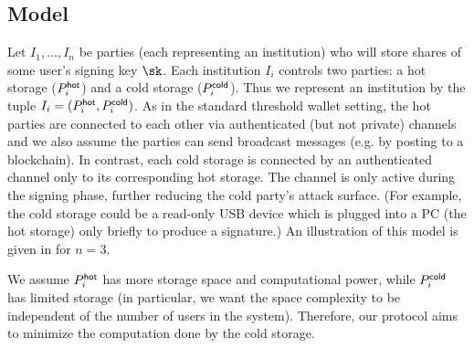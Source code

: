 \subsection{Model}\label{sec:model}



Let $I_1, \ldots, I_n$ be parties (each representing an institution) who will store shares of some user's signing key $\sk$. Each institution $I_i$ controls two parties: a hot storage ($P_i^{\mathsf{hot}}$) and a cold storage ($P_i^{\mathsf{cold}}$). Thus we represent an institution by the tuple $I_i = (P_i^{\mathsf{hot}}, P_i^{\mathsf{cold}})$. 
As in the standard threshold wallet setting, the hot parties are connected to each other via authenticated (but not private) channels and we also assume the parties can send broadcast messages (e.g. by posting to a blockchain).  %
In contrast, each cold storage is connected by an authenticated channel only to its corresponding hot storage. The channel is only active during the signing phase, further reducing the cold party's attack surface. (For example, the cold storage could be a read-only USB device which is plugged into a PC (the hot storage) only briefly to produce a signature.) 
An illustration of this model is given in  for $n=3$.

We assume $P_i^{\mathsf{hot}}$ has more storage space and computational power, while $P_i^{\mathsf{cold}}$ has limited storage (in particular, we want the space complexity to be independent of the number of users in the system). 
Therefore, our protocol aims to minimize the computation done by the cold storage.